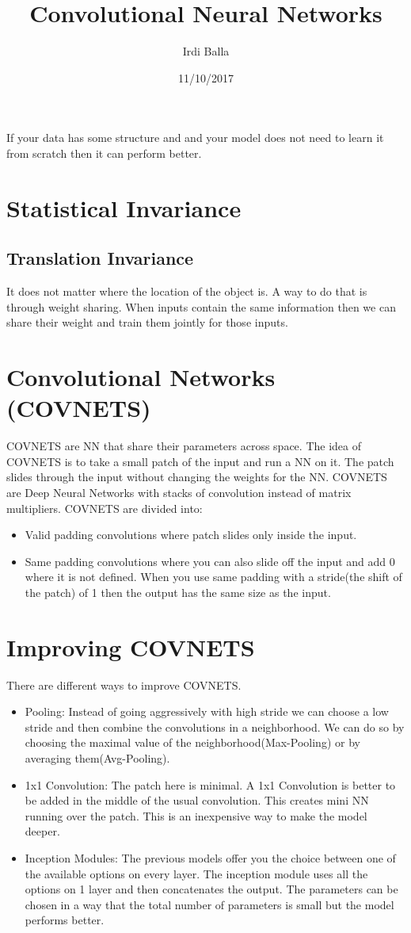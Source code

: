 \documentclass{article}
\title{Convolutional Neural Networks}
\date{11/10/2017}
\author{Irdi Balla}
\begin{document}
	\maketitle
	If your data has some structure and and your model does not need to learn it from scratch then it can perform better.
	\section{Statistical Invariance}
	\subsection{Translation Invariance}
	It does not matter where the location of the object is. A way to do that is through weight sharing. When inputs contain the same information then we can share their weight and train them jointly for those inputs.
	\section{Convolutional Networks (COVNETS)}
	COVNETS are NN that share their parameters across space. The idea of COVNETS is to take a small patch of the input and run a NN on it. The patch slides through the input without changing the weights for the NN. COVNETS are Deep Neural Networks with stacks of convolution instead of matrix multipliers. COVNETS are divided into: 
	\begin{itemize}	
		\item Valid padding convolutions where patch slides only inside the input.
		\item Same padding convolutions where you can also slide off the input and add 0 where it is not defined. When you use same padding with a stride(the shift of the patch) of 1 then the output has the same size as the input.
	\end{itemize}

	\section{Improving COVNETS}
	There are different ways to improve COVNETS.
	\begin{itemize}
		\item Pooling: Instead of going aggressively with  high stride we can choose a low stride and then combine the convolutions in a neighborhood. We can do so by choosing the maximal value of the neighborhood(Max-Pooling) or by averaging them(Avg-Pooling).
		\item 1x1 Convolution: The patch here is minimal. A 1x1 Convolution is better to be added in the middle of the usual convolution. This creates mini NN running over the patch. This is an inexpensive way to make the model deeper.
		\item Inception Modules: The previous models offer you the choice between one of the available options on every layer. The inception module uses all the options on 1 layer and then concatenates the output. The parameters can be chosen in a way that the total number of parameters is small but the model performs better.
			
	\end{itemize}
	
\end{document}
